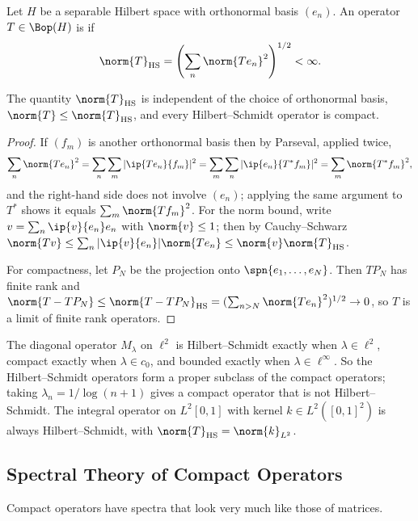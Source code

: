 \begin{definition}
	Let $H$ be a separable Hilbert space with orthonormal basis $(e_n)$. An operator $T \in \Bop(H)$ is  if
	$$\norm{T}_{\mathrm{HS}} = \left( \sum_n \norm{Te_n}^2 \right)^{1/2} < \infty.$$
\end{definition}

\begin{proposition}
	The quantity $\norm{T}_{\mathrm{HS}}$ is independent of the choice of orthonormal basis, $\norm{T}\leq\norm{T}_{\mathrm{HS}}$, and every Hilbert--Schmidt operator is compact.
\end{proposition}

\begin{proof}
	If $(f_m)$ is another orthonormal basis then by Parseval, applied twice,
	$$\sum_n \norm{Te_n}^2 = \sum_n\sum_m|\ip{Te_n}{f_m}|^2 = \sum_m\sum_n|\ip{e_n}{T^*f_m}|^2 = \sum_m\norm{T^*f_m}^2,$$
	and the right-hand side does not involve $(e_n)$; applying the same argument to $T^*$ shows it equals $\sum_m\norm{Tf_m}^2$. For the norm bound, write $v = \sum_n\ip{v}{e_n}e_n$ with $\norm{v}\leq1$; then by Cauchy--Schwarz $\norm{Tv}\leq\sum_n|\ip{v}{e_n}|\norm{Te_n}\leq\norm{v}\norm{T}_{\mathrm{HS}}$.

	For compactness, let $P_N$ be the projection onto $\spn\{e_1,\dots,e_N\}$. Then $TP_N$ has finite rank and $\norm{T - TP_N}\leq\norm{T-TP_N}_{\mathrm{HS}} = (\sum_{n>N}\norm{Te_n}^2)^{1/2}\to0$, so $T$ is a limit of finite rank operators.
\end{proof}

\begin{example}
	The diagonal operator $M_\lambda$ on $\ell^2$ is Hilbert--Schmidt exactly when $\lambda \in \ell^2$, compact exactly when $\lambda\in c_0$, and bounded exactly when $\lambda\in\ell^\infty$. So the Hilbert--Schmidt operators form a proper subclass of the compact operators; taking $\lambda_n = 1/\log(n+1)$ gives a compact operator that is not Hilbert--Schmidt. The integral operator on $L^2[0,1]$ with kernel $k \in L^2([0,1]^2)$ is always Hilbert--Schmidt, with $\norm{T}_{\mathrm{HS}}=\norm{k}_{L^2}$.
\end{example}

\subsection{Spectral Theory of Compact Operators}

Compact operators have spectra that look very much like those of matrices.

